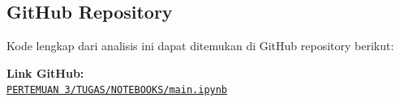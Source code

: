 \documentclass[11pt,a4paper]{article}
\begin{document}
    \subsection{GitHub Repository}
    Kode lengkap dari analisis ini dapat ditemukan di GitHub repository berikut:

    \begin{tcolorbox}[colback=blue!5,colframe=blue!50]
        \textbf{Link GitHub:} \\
        \href{https://github.com/sttnf/machine-learning/tree/main/PERTEMUAN\%203/TUGAS/NOTEBOOKS/main.ipynb}{\texttt{PERTEMUAN 3/TUGAS/NOTEBOOKS/main.ipynb}}

    \end{tcolorbox}
\end{document}
